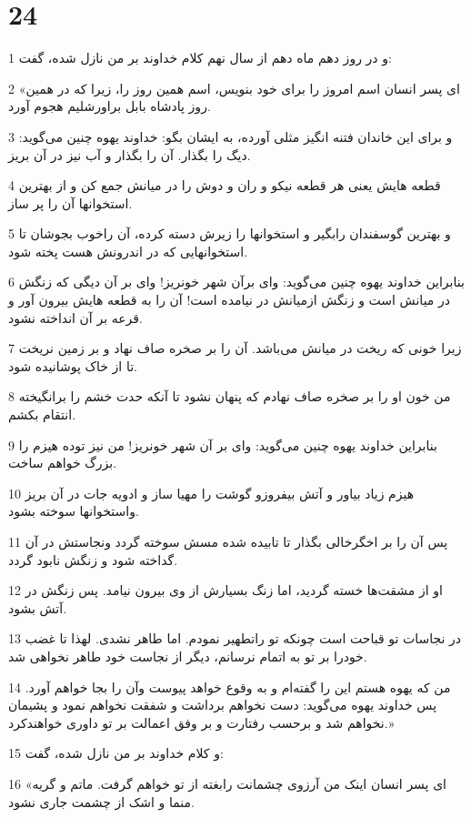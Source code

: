 \chapter{24}

\par 1 و در روز دهم ماه دهم از سال نهم کلام خداوند بر من نازل شده، گفت:
\par 2 «ای پسر انسان اسم امروز را برای خود بنویس، اسم همین روز را، زیرا که در همین روز پادشاه بابل براورشلیم هجوم آورد.
\par 3 و برای این خاندان فتنه انگیز مثلی آورده، به ایشان بگو: خداوند یهوه چنین می‌گوید: دیگ را بگذار. آن را بگذار و آب نیز در آن بریز.
\par 4 قطعه هایش یعنی هر قطعه نیکو و ران و دوش را در میانش جمع کن و از بهترین استخوانها آن را پر ساز.
\par 5 و بهترین گوسفندان رابگیر و استخوانها را زیرش دسته کرده، آن راخوب بجوشان تا استخوانهایی که در اندرونش هست پخته شود.
\par 6 بنابراین خداوند یهوه چنین می‌گوید: وای برآن شهر خونریز! وای بر آن دیگی که زنگش در میانش است و زنگش ازمیانش در نیامده است! آن را به قطعه هایش بیرون آور و قرعه بر آن انداخته نشود.
\par 7 زیرا خونی که ریخت در میانش می‌باشد. آن را بر صخره صاف نهاد و بر زمین نریخت تا از خاک پوشانیده شود.
\par 8 من خون او را بر صخره صاف نهادم که پنهان نشود تا آنکه حدت خشم را برانگیخته انتقام بکشم.
\par 9 بنابراین خداوند یهوه چنین می‌گوید: وای بر آن شهر خونریز! من نیز توده هیزم را بزرگ خواهم ساخت.
\par 10 هیزم زیاد بیاور و آتش بیفروزو گوشت را مهیا ساز و ادویه جات در آن بریز واستخوانها سوخته بشود.
\par 11 پس آن را بر اخگرخالی بگذار تا تابیده شده مسش سوخته گردد ونجاستش در آن گداخته شود و زنگش نابود گردد.
\par 12 او از مشقت‌ها خسته گردید، اما زنگ بسیارش از وی بیرون نیامد. پس زنگش در آتش بشود.
\par 13 در نجاسات تو قباحت است چونکه تو راتطهیر نمودم. اما طاهر نشدی. لهذا تا غضب خودرا بر تو به اتمام نرسانم، دیگر از نجاست خود طاهر نخواهی شد.
\par 14 من که یهوه هستم این را گفته‌ام و به وقوع خواهد پیوست وآن را بجا خواهم آورد. پس خداوند یهوه می‌گوید: دست نخواهم برداشت و شفقت نخواهم نمود و پشیمان نخواهم شد و بر‌حسب رفتارت و بر وفق اعمالت بر تو داوری خواهندکرد.»
\par 15 و کلام خداوند بر من نازل شده، گفت:
\par 16 «ای پسر انسان اینک من آرزوی چشمانت رابغته از تو خواهم گرفت. ماتم و گریه منما و اشک از چشمت جاری نشود.
